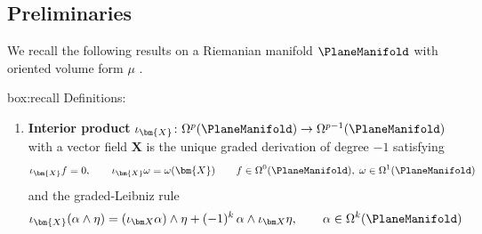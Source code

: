 
\subsection{Preliminaries}

We recall the following results on a Riemanian manifold \(\PlaneManifold\) with oriented volume form \(\mu\) \citep{marsden1994mathematical,abraham1988manifolds}.

\begin{ambox}{box:recall}
Definitions:
\begin{enumerate}
\item \textbf{Interior product} 
$\interior{\bm{X}}{}\colon \Omega^p(\PlaneManifold) \rightarrow \Omega^{p-1}(\PlaneManifold)$ with a vector field \(\bm{X}\)  is 
the {unique graded derivation of degree \(-1\)} satisfying  
\begin{equation}
\interior{\bm{X}}{f} = 0,
\qquad
\interior{\bm{X}}{\omega} = \omega(\bm{X})
\qquad
f\in\Omega^{0}(\PlaneManifold),
\;\omega\in\Omega^{1}(\PlaneManifold)
\label{eq:def-interior-base}
\end{equation}
and the graded-Leibniz rule 
\[
\interior{\bm {X}}{(\alpha\wedge \eta)}
      = (\interior{\bm X}{\alpha})\wedge \eta
      + (-1)^{k}\,\alpha\wedge\interior{\bm X}{ \eta},
\qquad
\alpha\in\Omega^{k} (\PlaneManifold)
\]


\end{enumerate}
\end{ambox}
